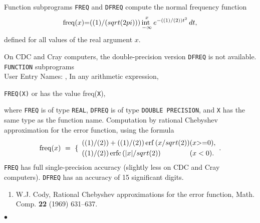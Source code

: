          
             
         
                \Revised{}
Function subprograms {\tt FREQ} and {\tt DFREQ} compute the
normal frequency function
$$ \begin{array}{r@{ \quad = \quad }l}
\mathrm{freq}(x) & \displaystyle \frac{1}{\sqrt{2\pi}}\int_{-\infty}^x
e^{-\frac{1}{2}t^2}\, dt,
\end{array} $$
defined for all values of the real argument $x$.
\par
On CDC and Cray computers, the double-precision version {\tt DFREQ} is
not available.
\Structure
{\tt FUNCTION} subprograms\\
User Entry Names: , 
\Usage
In any arithmetic expression,
\begin{center}
{\tt FREQ(X)} \quad or 
\quad has the value \quad freq({\tt X}),
\end{center}
where {\tt FREQ} is of type {\tt REAL}, {\tt DFREQ} is of type
{\tt DOUBLE PRECISION}, and {\tt X} has the same type as the function
name.
\Method
Computation by rational Chebyshev approximation for the error function,
using the formula
$$ \mathrm{freq}(x) \ = \ \left\{ \begin{array}{l@{\qquad}l}
\textstyle \frac{1}{2} + \frac{1}{2}\, \mathrm{erf}\,(x/\sqrt{2}) &
(x\geq 0), \\[1mm]
\textstyle \frac{1}{2}\, \mathrm{erfc}\,(|x|/\sqrt{2}) & (x<0).
\end{array} \right. $$
\Accuracy
{\tt FREQ} has full single-precision accuracy (slightly less on CDC and
Cray computers). {\tt DFREQ} has an accuracy  of 15 significant digits.
\Refer
\begin{enumerate}
\item W.J. Cody, Rational Chebyshev approximations for the error
function, Math. Comp. {\bf 22} (1969) 631--637.
\end{enumerate}
$\bullet$
